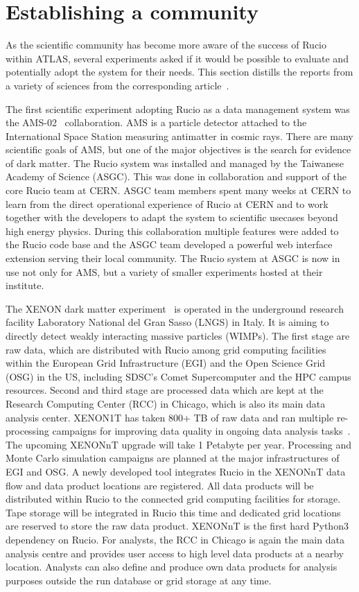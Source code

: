 \documentclass[11pt]{article}
\begin{document}
\section{Establishing a community}
\label{sec:beyond}

As the scientific community has become more aware of the success of Rucio within ATLAS, several experiments asked if it would be possible to evaluate and potentially adopt the system for their needs. This section distills the reports from a variety of sciences from the corresponding article~\cite{beyond}.

The first scientific experiment adopting Rucio as a data management system was the AMS-02~\cite{ams} collaboration. AMS is a particle detector attached to the International Space Station measuring antimatter in cosmic rays. There are many scientific goals of AMS, but one of the major objectives is the search for evidence of dark matter. The Rucio system was installed and managed by the Taiwanese Academy of Science (ASGC). This was done in collaboration and support of the core Rucio team at CERN. ASGC team members spent many weeks at CERN to learn from the direct operational experience of Rucio at CERN and to work together with the developers to adapt the system to scientific usecases beyond high energy physics. During this collaboration multiple features were added to the Rucio code base and the ASGC team developed a powerful web interface extension serving their local community. The Rucio system at ASGC is now in use not only for AMS, but a variety of smaller experiments hosted at their institute.

The XENON dark matter experiment~\cite{xenondm} is operated in the underground research facility Laboratory National del Gran Sasso (LNGS) in Italy. It is aiming to directly detect weakly interacting massive particles (WIMPs). The first stage are raw data, which are distributed with Rucio among grid computing facilities within the European Grid Infrastructure (EGI) and the Open Science Grid (OSG) in the US, including SDSC's Comet Supercomputer and the HPC campus resources. Second and third stage are processed data which are kept at the Research Computing Center (RCC) in Chicago, which is also its main data analysis center. XENON1T has taken 800+ TB of raw data and ran multiple re-processing campaigns for improving data quality in ongoing data analysis tasks~\cite{xenoncp}. The upcoming XENONnT upgrade will take 1 Petabyte per year. Processing and Monte Carlo simulation campaigns are planned at the major infrastructures of EGI and OSG. A newly developed tool integrates Rucio in the XENONnT data flow and data product locations are registered. All data products will be distributed within Rucio to the connected grid computing facilities for storage. Tape storage will be integrated in Rucio this time and dedicated grid locations are reserved to store the raw data product. XENONnT is the first hard Python3 dependency on Rucio. For analysts, the RCC in Chicago is again the main data analysis centre and provides user access to high level data products at a nearby location. Analysts can also define and produce own data products for analysis purposes outside the run database or grid storage at any time. 
\end{document}
